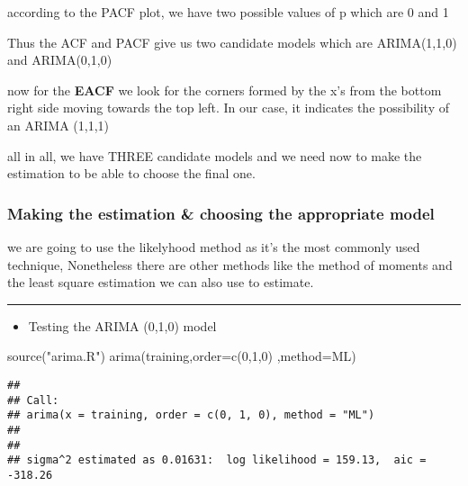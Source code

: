 \documentclass[
]{article}
\newenvironment{Shaded}{\begin{snugshade}}{\end{snugshade}}
\newcommand{\AttributeTok}[1]{\textcolor[rgb]{0.77,0.63,0.00}{#1}}
\newcommand{\DecValTok}[1]{\textcolor[rgb]{0.00,0.00,0.81}{#1}}
\newcommand{\FunctionTok}[1]{\textcolor[rgb]{0.00,0.00,0.00}{#1}}
\newcommand{\NormalTok}[1]{#1}
\newcommand{\StringTok}[1]{\textcolor[rgb]{0.31,0.60,0.02}{#1}}
\providecommand{\tightlist}{%
  \setlength{\itemsep}{0pt}\setlength{\parskip}{0pt}}
\begin{document}
according to the PACF plot, we have two possible values of p which are 0
and 1

Thus the ACF and PACF give us two candidate models which are
ARIMA(1,1,0) and ARIMA(0,1,0)

now for the \textbf{EACF} we look for the corners formed by the x's from
the bottom right side moving towards the top left. In our case, it
indicates the possibility of an ARIMA (1,1,1)

all in all, we have THREE candidate models and we need now to make the
estimation to be able to choose the final one.

\hypertarget{making-the-estimation-choosing-the-appropriate-model}{%
\subsubsection{Making the estimation \& choosing the appropriate
model}\label{making-the-estimation-choosing-the-appropriate-model}}

we are going to use the likelyhood method as it's the most commonly used
technique, Nonetheless there are other methods like the method of
moments and the least square estimation we can also use to estimate.

\begin{center}\rule{0.5\linewidth}{0.5pt}\end{center}

\begin{itemize}
\tightlist
\item
  Testing the ARIMA (0,1,0) model
\end{itemize}

\begin{Shaded}
\begin{Highlighting}[]
\FunctionTok{source}\NormalTok{(}\StringTok{"arima.R"}\NormalTok{)}
\FunctionTok{arima}\NormalTok{(training,}\AttributeTok{order=}\FunctionTok{c}\NormalTok{(}\DecValTok{0}\NormalTok{,}\DecValTok{1}\NormalTok{,}\DecValTok{0}\NormalTok{) ,}\AttributeTok{method=}\StringTok{\textquotesingle{}ML\textquotesingle{}}\NormalTok{)}
\end{Highlighting}
\end{Shaded}

\begin{verbatim}
## 
## Call:
## arima(x = training, order = c(0, 1, 0), method = "ML")
## 
## 
## sigma^2 estimated as 0.01631:  log likelihood = 159.13,  aic = -318.26
\end{verbatim}
\end{document}
